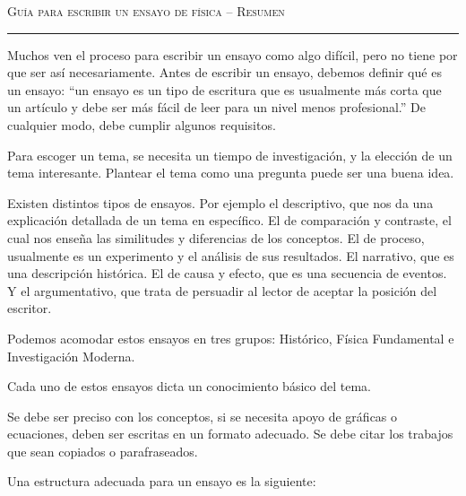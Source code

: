 \documentclass[11pt]{article}
\date{}
\newcommand{\myName}{Guía para escribir un ensayo de física \--- Resumen }
\theoremstyle{Tema} \newtheorem{Tema}{Tema} %
\theoremstyle{Tema} \newtheorem{Serie}{Serie}              %
\theoremstyle{Tema} \newtheorem{Ejercicio}{Ejercicio}    %
\begin{document}
\pagestyle{allStyle}

\thispagestyle{firststyle}
\begin{center}
\LARGE
\textsc{\myName} %
\medskip
\hrule height 1.5pt
\end{center}


\vspace{0.1 in}

Muchos ven el proceso para escribir un ensayo como algo difícil, pero no tiene por que ser así necesariamente. 
Antes de escribir un ensayo, debemos definir qué es un ensayo: ``un ensayo es un tipo de escritura que es usualmente más corta que un artículo y debe ser más fácil de leer para un nivel menos profesional.'' \cite{Guide}
De cualquier modo, debe cumplir algunos requisitos.

\medskip

Para escoger un tema, se necesita un tiempo de investigación, y la elección de un tema interesante. Plantear el tema como una pregunta puede ser una buena idea.

\medskip

Existen distintos tipos de ensayos. Por ejemplo el descriptivo, que nos da una explicación detallada de un tema en específico. El de comparación y contraste, el cual nos enseña las similitudes y diferencias de los conceptos. El de proceso, usualmente es un experimento y el análisis de sus resultados. El narrativo, que es una descripción histórica. El de causa y efecto, que es una secuencia de eventos. Y el argumentativo, que trata de persuadir al lector de aceptar la posición del escritor.

\medskip

Podemos acomodar estos ensayos en tres grupos: Histórico, Física Fundamental e Investigación Moderna. 

Cada uno de estos ensayos dicta un conocimiento básico del tema.

Se debe ser preciso con los conceptos, si se necesita apoyo de gráficas o ecuaciones, deben ser escritas en un formato adecuado. Se debe citar los trabajos que sean copiados o parafraseados.

\medskip

Una estructura adecuada para un ensayo es la siguiente:
\end{document}
